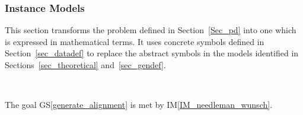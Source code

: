 \documentclass[12pt]{article}
\newcommand{\gsref}[1]{GS\ref{#1}}
\newcommand{\iref}[1]{IM\ref{#1}}
\begin{document}
\subsubsection{Instance Models} \label{sec_instance}    


This section transforms the problem defined in Section~\ref{Sec_pd} into 
one which is expressed in mathematical terms. It uses concrete symbols defined 
in Section~\ref{sec_datadef} to replace the abstract symbols in the models 
identified in Sections~\ref{sec_theoretical} and~\ref{sec_gendef}.




~\newline

The goal \gsref{generate_alignment} is met by \iref{IM_needleman_wunsch}. 
\end{document}
